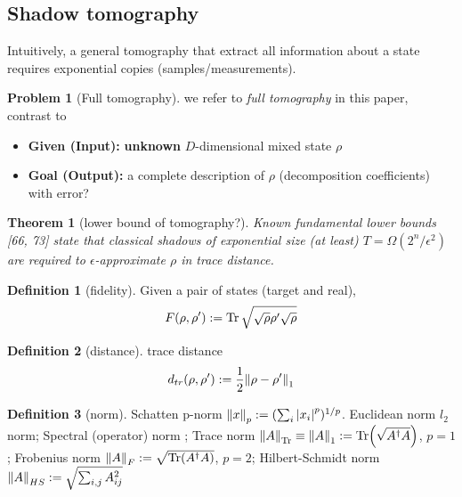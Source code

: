 \documentclass[
10pt,
aps,
pra,
linenumbers,
floatfix,
]{revtex4-2}
\theoremstyle{plain}
\newtheorem{theorem}{Theorem}
\theoremstyle{definition}
\newtheorem{definition}{Definition}
\newtheorem{problem}{Problem}
\newcommand{\dm}{\rho}
\begin{document}
\subsection{Shadow tomography}
Intuitively, a general tomography \cite{altepeterPhotonicStateTomography2005} that extract all information about a state requires exponential copies (samples/measurements).
\begin{problem}[Full tomography]\label{prm:full_tomography}
	we refer to \emph{full tomography} in this paper, contrast to 
	\begin{itemize}
		\item \textbf{Given (Input):} \textbf{unknown} $D$-dimensional mixed state $\dm$
		\item \textbf{Goal (Output):} a complete description of $\dm$ (decomposition coefficients) with error?
	\end{itemize}
\end{problem}
\begin{theorem}[lower bound of tomography?\cite{haahSampleoptimalTomographyQuantum2017}]
	Known fundamental lower bounds [66, 73] state that classical shadows of exponential size (at least) $T = \Omega( 2^n / \epsilon^2)$ are required to $\epsilon$-approximate $\dm$ in trace distance.
\end{theorem}
\begin{definition}[fidelity]\label{def:fidelity}
	Given a pair of states (target and real), 
	\begin{equation}
		F(\rho,\rho') : = \Tr \sqrt{\sqrt{\rho}\rho'\sqrt{\rho}}
	\end{equation}
\end{definition}
\begin{definition}[distance]\label{def:distance}
	trace distance
	\begin{equation}
		d_{tr}(\rho,\rho') : = \frac{1}{2} \norm{\rho-\rho'}_1
	\end{equation}
\end{definition}
\begin{definition}[norm]\label{def:norm}
	Schatten p-norm $\norm{x}_p:= (\sum_i \abs{x_i}^p)^{1/p}$.
	Euclidean norm $l_2$ norm;
	Spectral (operator) norm ;
	Trace norm $\norm{A}_{\Tr}\equiv\norm{A}_{1}:=\Tr(\sqrt{A^\dagger A})$, $p=1$;
	Frobenius norm $\norm{A}_{F}:=\sqrt{\Tr(A^\dagger A)}$, $p=2$;
	Hilbert-Schmidt norm $\norm{A}_{HS}:=\sqrt{\sum_{i,j} A_{ij}^2 }$
\end{definition}
\end{document}
